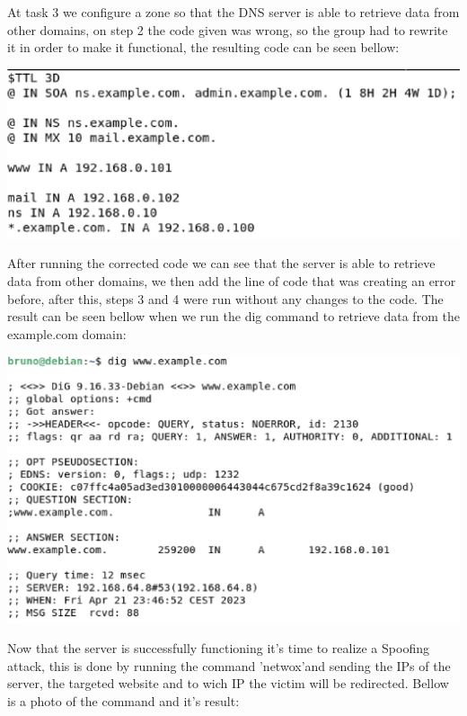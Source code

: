 \documentclass{article}
\begin{document}
At task 3 we configure a zone so that the DNS server is able to retrieve data from other domains, on step 2 the code given was wrong, so the group had to rewrite it in order to make it functional, the resulting code can be seen bellow:

\begin{center}
  \includegraphics[scale=0.5]{images/bind-config-corrected.png}
\end{center}

After running the corrected code we can see that the server is able to retrieve data from other domains, we then add the line of code that was creating an error before, after this, steps 3 and 4 were run without any changes to the code.
The result can be seen bellow when we run the dig command to retrieve data from the example.com domain:

\begin{center}
  \includegraphics[scale=0.5]{images/dig-examplecom.png}
\end{center}


Now that the server is successfully functioning it's time to realize a Spoofing attack, this is done by running the command 'netwox'and sending the IPs of the server, the targeted website and to wich IP the victim will be redirected.
Bellow is a photo of the command and it's result:
\end{document}
